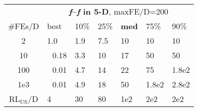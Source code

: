 \begin{tabular}{c|llllll}
 & \multicolumn{6}{|c}{\textbf{\textit{f}\raisebox{-0.35ex}{1}--\textit{f}\raisebox{-0.35ex}{24} in 5-D}, maxFE/D=200}\\
\#FEs/D & best & 10\% & 25\% & \textbf{med} & 75\% & 90\%\\
2 & \hspace*{1ex}1.0 & \hspace*{1ex}1.9 & \hspace*{1ex}7.5 & 10 & 10 & 10\\
10 & ~\,0.18 & \hspace*{1ex}3.3 & 10 & 17 & 50 & 50\\
100 & ~\,0.01 & \hspace*{1ex}4.7 & 14 & 22 & 75 & 1.8e2\\
1e3 & ~\,0.01 & \hspace*{1ex}4.9 & 18 & 50 & 1.8e2 & 2.8e2\\
$\text{RL}_{\text{US}}$/D & 4 & 30 & 80 & 1e2 & 2e2 & 2e2
\end{tabular}
